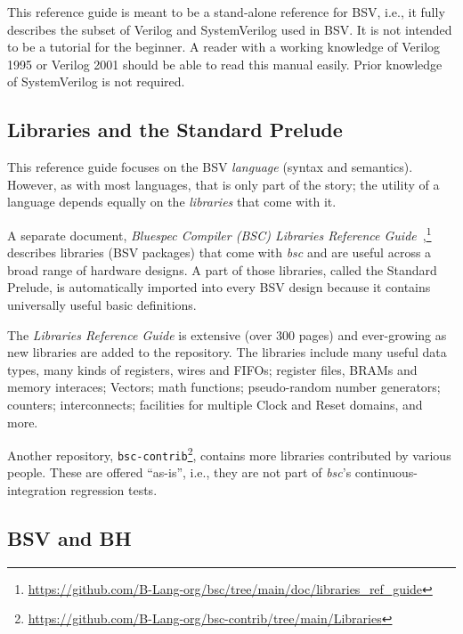 \documentclass[twoside,letterpaper]{article}
\newcommand{\LibRefGuide}{\emph{Libraries Reference Guide}}
\newcommand{\LibRefGuideFullName}{\emph{Bluespec Compiler (BSC) Libraries Reference Guide}}
\newcommand{\BH}{BH}
\newcommand{\BSV}{BSV}
\newcommand{\bsc}{\emph{bsc}}
\newcommand{\SV}{SystemVerilog}
\newcommand{\V}{Verilog}
\begin{document}
This reference guide is meant to be a stand-alone reference for
{\BSV}, i.e., it fully describes the subset of {\V} and {\SV} used in
{\BSV}.  It is not intended to be a tutorial for the beginner.  A
reader with a working knowledge of {\V} 1995 or {\V} 2001 should be
able to read this manual easily.  Prior knowledge of {\SV} is not
required.


\subsection{Libraries and the Standard Prelude}


This reference guide focuses on the {\BSV} \emph{language} (syntax and
semantics).  However, as with most languages, that is only part of the
story; the utility of a language depends equally on the
\emph{libraries} that come with it.

A separate document,
{\LibRefGuideFullName}~\cite{BLangLibsDoc},\footnote{
  \url{https://github.com/B-Lang-org/bsc/tree/main/doc/libraries_ref_guide}}
describes libraries ({\BSV} packages) that come with {\bsc} and are
useful across a broad range of hardware designs.  A part of those
libraries, called the Standard Prelude, is automatically imported into
every {\BSV} design because it contains universally useful basic
definitions.

The {\LibRefGuide} is extensive (over 300 pages) and ever-growing as
new libraries are added to the repository.  The libraries include many
useful data types, many kinds of registers, wires and FIFOs; register
files, BRAMs and memory interaces; Vectors; math functions;
pseudo-random number generators; counters; interconnects; facilities
for multiple Clock and Reset domains, and more.

Another repository, \texttt{bsc-contrib}\footnote{
  \url{https://github.com/B-Lang-org/bsc-contrib/tree/main/Libraries}},
contains more libraries contributed by various people.  These are
offered ``as-is'', i.e., they are not part of {\bsc}'s
continuous-integration regression tests.


\subsection{{\BSV} and {\BH}}
\end{document}
